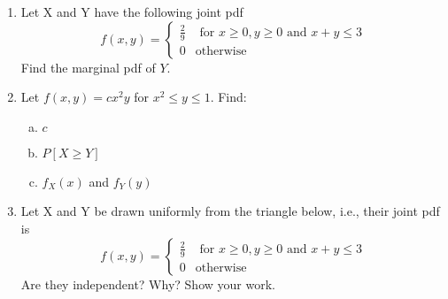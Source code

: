 \documentclass[11pt]{article}
\begin{document}
\begin{enumerate}
\item Let X and Y have the following joint pdf
\[ f(x,y) = \begin{cases}
    \frac{2}{9} & \text{ for } x\geq 0, y \geq 0 \text{ and } x+y \leq 3 \\
    0           & \text{otherwise}
\end{cases}
 \]
Find the marginal pdf of $Y$.

\item Let $f(x,y) = c x^2 y$ for $x^2 \leq y \leq 1$. Find:
\begin{enumerate}[(a)]
\item $c$
\item $P[ X \geq Y ]$
\item $f_X(x)$ and $f_Y(y)$
\end{enumerate}


\item Let X and Y be drawn uniformly from the triangle below, i.e., their
joint pdf is
\[ f(x,y) = \begin{cases}
    \frac{2}{9} & \text{ for } x\geq 0, y \geq 0 \text{ and } x+y \leq 3 \\
    0           & \text{otherwise}
\end{cases}
 \]
Are they independent? Why? Show your work.

\end{enumerate}
\end{document}
